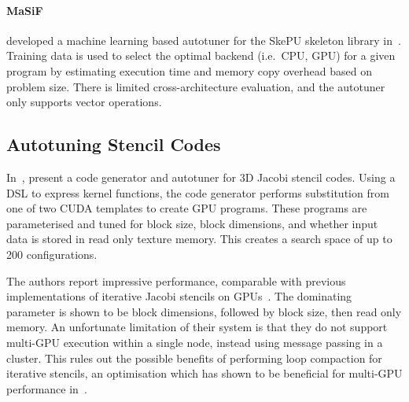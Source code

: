 \paragraph{MaSiF} 


\citeauthor{Dastgeer2011} developed a machine learning based autotuner
for the SkePU skeleton library in~\cite{Dastgeer2011}. Training data
is used to select the optimal backend (i.e.\ CPU, GPU) for a given
program by estimating execution time and memory copy overhead based on
problem size. There is limited cross-architecture evaluation, and the
autotuner only supports vector operations.



\subsection{Autotuning Stencil Codes}

In~\cite{Zhang2013a}, \citeauthor{Zhang2013a} present a code generator
and autotuner for 3D Jacobi stencil codes. Using a DSL to express
kernel functions, the code generator performs substitution from one of
two CUDA templates to create GPU programs. These programs are
parameterised and tuned for block size, block dimensions, and whether
input data is stored in read only texture memory. This creates a
search space of up to 200 configurations.

The authors report impressive performance, comparable with previous
implementations of iterative Jacobi stencils on
GPUs~\cite{Holewinski2012,Phillips2010}. The dominating parameter is
shown to be block dimensions, followed by block size, then read only
memory. An unfortunate limitation of their system is that they do not
support multi-GPU execution within a single node, instead using
message passing in a cluster. This rules out the possible benefits of
performing loop compaction for iterative stencils, an optimisation
which has shown to be beneficial for multi-GPU performance
in~\cite{Lutz2013}.

